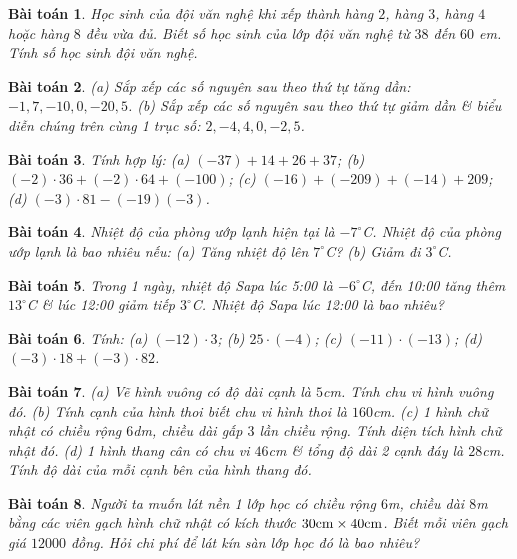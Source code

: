 \documentclass[11pt]{article}
\numberwithin{equation}{section}
\newtheorem{baitoan}{Bài toán}[section]
\begin{document}
\begin{baitoan}
	Học sinh của đội văn nghệ khi xếp thành hàng $2$, hàng $3$, hàng $4$ hoặc hàng $8$ đều vừa đủ. Biết số học sinh của lớp đội văn nghệ từ $38$ đến $60$ em. Tính số học sinh đội văn nghệ.
\end{baitoan}

\begin{baitoan}
	(a) Sắp xếp các số nguyên sau theo thứ tự tăng dần: $-1,7,-10,0,-20,5$. (b) Sắp xếp các số nguyên sau theo thứ tự giảm dần \& biểu diễn chúng trên cùng 1 trục số: $2,-4,4,0,-2,5$.
\end{baitoan}

\begin{baitoan}
	Tính hợp lý: (a) $(-37) + 14 + 26 + 37$; (b) $(-2)\cdot36 + (-2)\cdot64 + (-100)$; (c) $(-16) + (-209) + (-14) + 209$; (d) $(-3)\cdot81 - (-19)(-3)$.
\end{baitoan}

\begin{baitoan}
	Nhiệt độ của phòng ướp lạnh hiện tại là $-7^\circ$C. Nhiệt độ của phòng ướp lạnh là bao nhiêu nếu: (a) Tăng nhiệt độ lên $7^\circ$C? (b) Giảm đi $3^\circ$C.
\end{baitoan}

\begin{baitoan}
	Trong 1 ngày, nhiệt độ Sapa lúc 5:00 là $-6^\circ$C, đến 10:00 tăng thêm $13^\circ$C \& lúc 12:00 giảm tiếp $3^\circ$C. Nhiệt độ Sapa lúc 12:00 là bao nhiêu?
\end{baitoan}

\begin{baitoan}
	Tính: (a) $(-12)\cdot3$; (b) $25\cdot(-4)$; (c) $(-11)\cdot(-13)$; (d) $(-3)\cdot18 + (-3)\cdot82$.
\end{baitoan}

\begin{baitoan}
	(a) Vẽ hình vuông có độ dài cạnh là $5$\emph{cm}. Tính chu vi hình vuông đó. (b) Tính cạnh của hình thoi biết chu vi hình thoi là $160$\emph{cm}. (c) 1 hình chữ nhật có chiều rộng $6$\emph{dm}, chiều dài gấp $3$ lần chiều rộng. Tính diện tích hình chữ nhật đó. (d) 1 hình thang cân có chu vi $46$\emph{cm} \& tổng độ dài 2 cạnh đáy là $28$\emph{cm}. Tính độ dài của mỗi cạnh bên của hình thang đó.
\end{baitoan}

\begin{baitoan}
	Người ta muốn lát nền 1 lớp học có chiều rộng $6$\emph{m}, chiều dài $8$\emph{m} bằng các viên gạch hình chữ nhật có kích thước $\rm30cm\times40cm$. Biết mỗi viên gạch giá $12000$ đồng. Hỏi chi phí để lát kín sàn lớp học đó là bao nhiêu?
\end{baitoan}


\printbibliography[heading=bibintoc]
	
\end{document}
